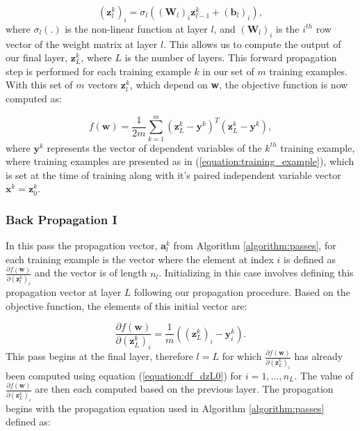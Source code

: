 \documentclass[letterpaper,12pt,titlepage,oneside,final]{book}
\begin{document}
	\begin{equation}
	(\mathbf{z}_{l}^{k})_{i} = \sigma_{l}((\mathbf{W}_{l})_{i}\mathbf{z}_{l-1}^{k} + (\mathbf{b}_{l})_{i}), 
	\label{equation:pass1_pe}
	\end{equation}
	where $\sigma_{l}(.)$ is the non-linear function at layer $l$, and $(\mathbf{W}_{l})_{i}$ is the $i^{th}$ row vector of the weight matrix at layer $l$. This allows us to compute the output of our final layer, $\mathbf{z}_{L}^{k}$, where $L$ is the number of layers. This forward propagation step is performed for each training example $k$ in our set of $m$ training examples. With this set of $m$ vectors $\mathbf{z}_{l}^{k}$, which depend on \textbf{w}, the objective function is now computed as:
	
	\begin{equation}
	f(\mathbf{w}) = \frac{1}{2m}\sum_{k=1}^{m}{(\mathbf{z}_{L}^{k} - \mathbf{y}^{k})^{T}(\mathbf{z}_{L}^{k} - \mathbf{y}^{k})},
	\end{equation}
	where $\mathbf{y}^k$ represents the vector of dependent variables of the $k^{th}$ training example, where training examples are presented as in (\ref{equation:training_example}), which is set at the time of training along with it's paired independent variable vector $\mathbf{x}^{k} = \mathbf{z}^{k}_{0}$.
	
	\subsubsection{Back Propagation I}
	
	In this pass the propagation vector, $\mathbf{a}^{k}_{l}$ from Algorithm \ref{algorithm:passes}, for each training example is the vector where the element at index $i$ is defined as  $\frac{\partial{f(\mathbf{w})}}{\partial{(\mathbf{z}^{k}_{l})_{i}}}$ and the vector is of length $n_{l}$. Initializing in this case involves defining this propagation vector at layer $L$ following our propagation procedure. Based on the objective function, the elements of this initial vector are:
	
	\begin{equation}
	\frac{\partial{f(\mathbf{w})}}{\partial{(\mathbf{z}^{k}_{L})_{i}}} = \frac{1}{m}((\mathbf{z}_{L}^{k})_{i} - \mathbf{y}^{k}_{i}).
	\label{equation:df_dzL0}
	\end{equation}
	This pass begins at the final layer, therefore $l = L$ for which $\frac{\partial{f(\mathbf{w})}}{\partial{(\mathbf{z}^{k}_{L})_{i}}}$ has already been computed using equation (\ref{equation:df_dzL0}) for $i=1,...,n_{L}$. The value of $\frac{\partial{f(\mathbf{w})}}{\partial{(\mathbf{z}^{k}_{L})_{i}}}$ are then each computed based on the previous layer. The propagation begins with the propagation equation used in Algorithm \ref{algorithm:passes} defined as:
	
\end{document}
